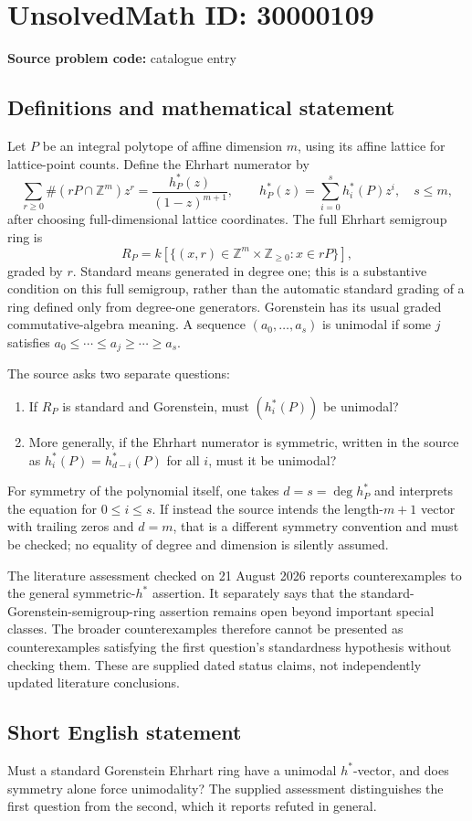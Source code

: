 \documentclass[11pt]{article}
\newcommand{\Z}{\mathbb{Z}}
\begin{document}
\section*{UnsolvedMath ID: 30000109}
\textbf{Source problem code:} catalogue entry
\subsection{Definitions and mathematical statement}
Let $P$ be an integral polytope of affine dimension $m$, using its affine lattice for lattice-point counts. Define the Ehrhart numerator by
\[
 \sum_{r\ge0}\#(rP\cap\Z^m)z^r
   =\frac{h_P^*(z)}{(1-z)^{m+1}},\qquad
 h_P^*(z)=\sum_{i=0}^{s}h_i^*(P)z^i,\quad s\le m,
\]
after choosing full-dimensional lattice coordinates. The full Ehrhart semigroup ring is
\[
 R_P=k[\{(x,r)\in\Z^m\times\Z_{\ge0}:x\in rP\}],
\]
graded by $r$. Standard means generated in degree one; this is a substantive condition on this full semigroup, rather than the automatic standard grading of a ring defined only from degree-one generators. Gorenstein has its usual graded commutative-algebra meaning. A sequence $(a_0,\ldots,a_s)$ is unimodal if some $j$ satisfies $a_0\le\cdots\le a_j\ge\cdots\ge a_s$.

The source asks two separate questions:
\begin{enumerate}
\item If $R_P$ is standard and Gorenstein, must $(h_i^*(P))$ be unimodal?
\item More generally, if the Ehrhart numerator is symmetric, written in the source as $h_i^*(P)=h_{d-i}^*(P)$ for all $i$, must it be unimodal?
\end{enumerate}
For symmetry of the polynomial itself, one takes $d=s=\deg h_P^*$ and interprets the equation for $0\le i\le s$. If instead the source intends the length-$m+1$ vector with trailing zeros and $d=m$, that is a different symmetry convention and must be checked; no equality of degree and dimension is silently assumed.

The literature assessment checked on 21 August 2026 reports counterexamples to the general symmetric-$h^*$ assertion. It separately says that the standard-Gorenstein-semigroup-ring assertion remains open beyond important special classes. The broader counterexamples therefore cannot be presented as counterexamples satisfying the first question's standardness hypothesis without checking them. These are supplied dated status claims, not independently updated literature conclusions.
\subsection{Short English statement}
Must a standard Gorenstein Ehrhart ring have a unimodal $h^*$-vector, and does symmetry alone force unimodality? The supplied assessment distinguishes the first question from the second, which it reports refuted in general.
\end{document}
